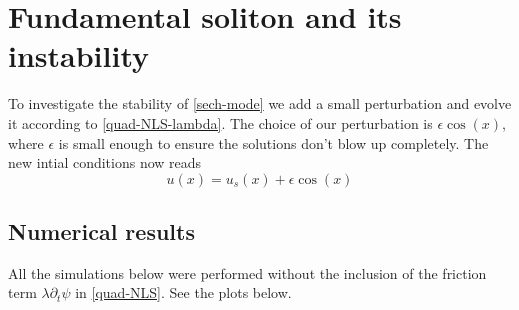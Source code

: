 \documentclass[12pt, letterpaper, twoside]{article}
\begin{document}
\section{Fundamental soliton and its instability}

 To investigate the stability of \eqref{sech-mode} we add a small perturbation and evolve it according to \eqref{quad-NLS-lambda}. The choice of our perturbation is $\epsilon \cos(x)$, where $\epsilon$ is small enough to ensure the solutions don't blow up completely. The new intial conditions now reads
 \begin{equation}\label{sech-perturbation}
     u(x) = u_s(x) + \epsilon \cos(x)
 \end{equation}
 

\subsection{Numerical results}
All the simulations below were performed without the inclusion of the friction term $\lambda \partial_t \psi$ in \eqref{quad-NLS}. See the plots below.
\end{document}
